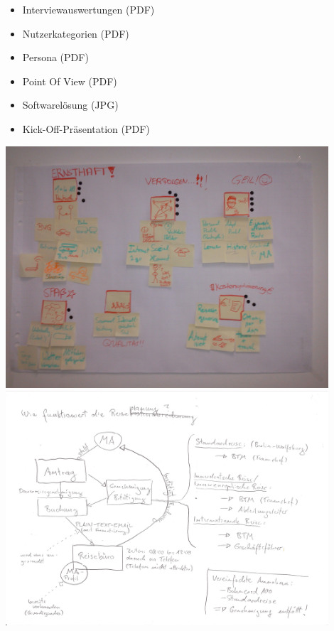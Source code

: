 \documentclass{article}
\begin{document}
\begin{itemize}
\item Interviewauswertungen (PDF)
\item Nutzerkategorien (PDF)
\item Persona (PDF)
\item Point Of View (PDF)
\item Softwarel\"osung (JPG)
\item Kick-Off-Pr\"asentation (PDF)
\end{itemize}



\begin{center}
\includegraphics[width=12cm]{04_softwareloesung01.jpg}\\
\includegraphics[width=12cm]{04_softwareloesung02_001.jpg}\\

\end{center}
\end{document}
